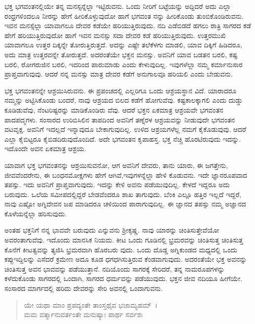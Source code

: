 ಭಕ್ತ ಭಗವಂತನಲ್ಲಿಯೇ ತನ್ನ ಮನಸ್ಸನ್ನೆಲ್ಲಾ ಇಟ್ಟಿರುವನು. ಒಂದು ನೀರಿಗೆ ಬಟ್ಟೆಯನ್ನು ಅದ್ದಿದರೆ ಅದು ಎಲ್ಲಾ ರಂಧ್ರಗಳಿಂದಲೂ ನೀರನ್ನು ಹೇಗೆ ಹೀರಿಕೊಳ್ಳುವುದೋ ಹಾಗೆ ಭಗವಂತ ನನ್ನು ಹೀರಿಕೊಂಡು ತುಂಬಿಕೊಂಡಿರುವನು. ಇವನ ಮನಸ್ಸೆಲ್ಲಾ ಯಾವಾಗಲೂ ದೇವರ ಕಡೆಯೇ ಹರಿಯುತ್ತಿರುವುದು. ನದಿ ಎಡೆಬಿಡದೆ ಹಗಲು ರಾತ್ರಿ ಸಾಗರದ ಕಡೆ ಹೇಗೆ ಹರಿಯುತ್ತಿರುವುದೋ ಹಾಗೆ ಇವನ ಮನಸ್ಸು ಸದಾ ದೇವರ ಕಡೆ ಹರಿಯುತ್ತಿರುವುದು. ಉತ್ತರಮುಖಿ ಯಾವಾಗಲೂ ಉತ್ತರ ದಿಕ್ಕನ್ನೇ ತೋರುತ್ತಿರುತ್ತದೆ. ಅದನ್ನು ಎಷ್ಟೇ ತಲೆಕೆಳಗು ಮಾಡಲಿ, ಯಾವ ದಿಕ್ಕಿಗೆ ಹಿಡಿದರೂ, ಅದು ಮಾತ್ರ ಉತ್ತರವನ್ನೇ ತೋರುತ್ತದೆ. ಅದರಂತೆಯೇ ಭಕ್ತನ ಮನಸ್ಸು. ಅವನಿಗೆ ಯಾವ ಬಡತನ ಬರಲಿ, ಕಷ್ಟ ಬರಲಿ, ರೋಗರುಜಿನ ಬರಲಿ, ಇದರಿಂದ ಪಾರುಮಾಡು ಎಂದು ಕೇಳುವುದಿಲ್ಲ. ಇವುಗಳೆಲ್ಲಾ ನಮ್ಮ ಕರ್ಮಾನುಸಾರ ಪ್ರಾಪ್ತವಾಗುವುವು. ಆದರೆ ನನ್ನ ಮನಸ್ಸು ಮಾತ್ರ ದೇವರ ಕಡೆಗೆ ಅನುಗಾಲವೂ ಹರಿಯಲಿ ಎಂದು ಬೇಡುವನು.

ಭಕ್ತ ಭಗವಂತನನ್ನೇ ಆಶ್ರಯಿಸಿರುವನು. ಈ ಪ್ರಪಂಚದಲ್ಲಿ ಎಲ್ಲರಿಗೂ ಒಂದು ಆಶ್ರಯಸ್ಥಾನ ವಿದೆ. ಯಾರಾದರೂ ನಮ್ಮನ್ನು ಅಟ್ಟಿಸಿಕೊಂಡು ಬಂದರೆ, ನಾವು ಆಶ್ರಯದ ಬಿಲದ ಕಡೆಗೆ ಹೋಗುವೆವು. ಕಷ್ಟಕಾಲಕ್ಕಾಗಲಿ ಎಂದು ದುಡ್ಡು ಕೂಡಿಡುವೆವು, ನೆಂಟರಿಷ್ಟರನ್ನು ಮಾಡಿಕೊಂಡಿರು ವೆವು. ಆದರೆ ಭಕ್ತನ ಏಕಮಾತ್ರ ಆಶ್ರಯವೇ ಭಗವಂತನ ಪಾದಪದ್ಮಗಳು. ಸಂಸಾರದ ಉರಿಬಿಸಿಲಿನ ತಾಪದಿಂದ ಅವನಿಗೆ ತಣ್ನೆರಳ ಆಶ್ರಯವನ್ನು ನೀಡುವುದೇ ಭಗವಂತನ ವಟವೃಕ್ಷ. ಅವನಿಗೆ ಇದಲ್ಲದೆ ಇನ್ನಾವುದೂ ಬೇಕಾಗುವುದಿಲ್ಲ. ಉಳಿದ ಆಶ್ರಯಗಳೆಲ್ಲ ನಮಗೆ ಕೈಕೊಡುವುವು. ಆದರೆ ಎಲ್ಲಾ ಕೈಬಿಟ್ಟರೂ ಕೈಬಿಡದಿರುವುದೊಂದಿದೆ. ಅದೇ ಭಗವಂತನ ಕೃಪಾಹಸ್ತ. ಭಕ್ತ ನೆಚ್ಚಿ ಹೊರಟಿರುವುದು ಇದನ್ನು. ಇದೊಂದೇ ಅವನ ಏಕಮಾತ್ರ ಆಶ್ರಯ.

ಯಾವಾಗ ಭಕ್ತ ಭಗವಂತನನ್ನು ಆಶ್ರಯಿಸುವನೋ, ಆಗ ಅವನಿಗೆ ದೇವರು, ತಾನು ಯಾರು, ಈ ಜಗತ್ತೇನು, ಜೀವವೆಂದರೇನು, ಈ ಬಂಧನಮೋಕ್ಷಗಳು ಹೇಗೆ ಆಗಿವೆ,ಇವುಗಳನ್ನೆಲ್ಲಾ ಹೇಳಿ ಕೊಡುವನು. ಇದೇ ಜ್ಞಾನರೂಪವಾದ ತಪಸ್ಸು. ಇದು ಅವನಿಗೆ ಪ್ರಾಪ್ತವಾಗುವುದು. ಇದನ್ನು ಕೇಳಿ ಅವನು ಪಡೆಯುವುದಿಲ್ಲ. ಕೇಳದೆ ಇದ್ದರೂ ಅದು ಬರುವುದು. ಒಲೆಯ ಸಮೀಪದಲ್ಲಿದ್ದರೆ ಬೇಡವೆಂದರೂ ಶಾಖ ತಾಗುವುದು. ಬೆಂಕಿ ಎಲ್ಲೂ ಹತ್ತಿರ ಇಲ್ಲದೆ ಇದ್ದರೆ, ನಾವು ಎಷ್ಟೋ ಅಗ್ನಿದೇವನ ಜಪ ಮಾಡಿದರೂ ಚಳಿಯಿಂದ ಪಾರಾಗುವುದಿಲ್ಲ. ಈ ಜ್ಞಾನದ ತಪಸ್ಸು ನಮ್ಮ ಅಜ್ಞಾನದ ಕೊಳೆಯನ್ನೆಲ್ಲಾ ಹರಿಸುವುದು.

ಅಂತಹ ಭಕ್ತನಿಗೆ ನನ್ನ ಭಾವವೇ ಬರುವುದು ಎನ್ನುವನು ಶ‍್ರೀಕೃಷ್ಣ. ನಾವು ಯಾರನ್ನು ಚಿಂತಿಸುತ್ತೇವೆಯೋ ಅವರಂತಾಗುವೆವು. ಇದೊಂದು ಮಾನಸಿಕ ನಿಯಮ. ಕೀಟ ಒಂದು ಗೂಡಿನಲ್ಲಿ ಭ್ರಮರವನ್ನು ಚಿಂತಿಸುತ್ತ ಚಿಂತಿಸುತ್ತ ಕೊನೆಗೆ ಕೀಟತ್ವವನ್ನು ತ್ಯಜಿಸಿ ಭ್ರಮರವಾಗಿ ಹೊರಬರು ವುದು. ಒಂದು ದೊಡ್ಡ ಅಗ್ನಿಕುಂಡದ ಮಧ್ಯದಲ್ಲಿ ಒಂದು ಕಪ್ಪುಇದ್ದಿಲನ್ನು ಎಸೆದರೆ ಕ್ರಮೇಣ ಅದೂ ಕೂಡ ಧಗಧಗಿಸುತ್ತಿರುವ ಕೆಂಡವಾಗುವುದು. ಅದರಂತೆಯೇ ಭಕ್ತ ಅವನನ್ನು ಚಿಂತಿಸುತ್ತ ಅವನ ಭಾವವನ್ನು ಪಡೆಯುತ್ತಾನೆ. ನದಿಯೊಂದು ಸಾಗರಕ್ಕೆ ಸೇರಿದರೆ, ತನ್ನ ನಾಮರೂಪಗಳನ್ನು ಕಳೆದುಕೊಂಡು ಸಾಗರದಲ್ಲಿ ಒಂದಾಗಿ, ಸಾಗರದ ಧರ್ಮವನ್ನು ಪಡೆಯುವುದು. ಭಕ್ತನ ಜೀವ ನದಿಯೂ ಹೀಗೆಯೇ. ಸಂಸಾರದ ಮಾರ್ಗದಲ್ಲಿ ಹರಿದು ದೇವರನ್ನು ಸೇರಿ ಅವನಲ್ಲಿ ಒಂದಾಗುವನು.

\begin{verse}
ಯೇ ಯಥಾ ಮಾಂ ಪ್ರಪದ್ಯಂತೇ ತಾಂಸ್ತಥೈವ ಭಜಾಮ್ಯಹಮ್~।\\ಮಮ ವರ್ತ್ಮಾನುವರ್ತಂತೇ ಮನುಷ್ಯಾಃ ಪಾರ್ಥ ಸರ್ವಶಃ 
\end{verse}


